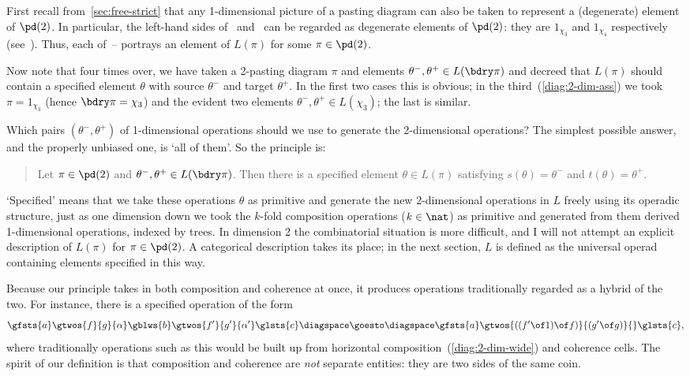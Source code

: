 First recall from~\ref{sec:free-strict} that any 1-dimensional picture of a
pasting diagram can also be taken to represent a (degenerate) element of
$\pd(2)$.  In particular, the left-hand sides of~
and~ can be regarded as degenerate elements of
$\pd(2)$: they are $1_{\chi_3}$ and $1_{\chi_4}$ respectively
(see~).  Thus, each
of~-- portrays an element of
$L(\pi)$ for some $\pi\in\pd(2)$.

Now note that four times over, we have taken a 2-pasting diagram $\pi$ and
elements $\theta^-, \theta^+ \in L(\bdry\pi)$ and decreed that $L(\pi)$
should contain a specified element $\theta$ with source $\theta^-$ and
target $\theta^+$.  In the first two cases this is obvious; in the
third~(\ref{diag:2-dim-ass}) we took $\pi = 1_{\chi_3}$ (hence $\bdry\pi =
\chi_3$) and the evident two elements $\theta^-, \theta^+ \in L(\chi_3)$; the
last is similar.

Which pairs $(\theta^-, \theta^+)$ of 1-dimensional operations should we
use to generate the 2-dimensional operations?  The simplest possible
answer, and the properly unbiased%
%
%
one, is `all of them'.  So the principle
is:
%
\begin{quote}
  Let $\pi \in \pd(2)$ and $\theta^-, \theta^+ \in L(\bdry\pi)$.  Then
  there is a specified element $\theta\in L(\pi)$ satisfying $s(\theta) =
  \theta^-$ and $t(\theta) = \theta^+$.
\end{quote}
%
`Specified' means that we take these operations $\theta$ as primitive and
generate the new 2-dimensional operations in $L$ freely using its operadic
structure, just as one dimension down we took the $k$-fold composition
operations ($k\in\nat$) as primitive and generated from them derived
1-dimensional operations, indexed by trees.  In dimension 2 the
combinatorial situation is more difficult, and I will not attempt an
explicit description of $L(\pi)$ for $\pi\in\pd(2)$.  A categorical
description takes its place; in the next section, $L$ is defined as the
universal operad containing elements specified in this way.

Because our principle takes in both composition%
%
%
%
% 
and coherence at once, it
produces operations traditionally regarded as a hybrid of the two.  For
instance, there is a specified operation of the form
\[
\gfsts{a}
\gtwos{f}{g}{\alpha}
\gblws{b}
\gtwos{f'}{g'}{\alpha'}
\glsts{c}
\diagspace \goesto \diagspace
\gfsts{a}
\gtwos{((f' \of 1) \of f)}{(g' \of g)}{} %
\glsts{c},
\]
where traditionally operations such as this would be built up from
horizontal composition~(\ref{diag:2-dim-wide}) and coherence cells.  The
spirit of our definition is that composition and coherence are \emph{not}
separate entities: they are two sides of the same coin.

